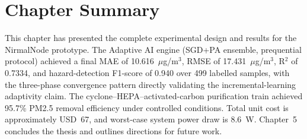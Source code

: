 \section{Chapter Summary}
\label{sec:exp-summary}

This chapter has presented the complete experimental design and results for the NirmalNode prototype. The Adaptive AI engine (SGD+PA ensemble, prequential protocol) achieved a final MAE of 10.616~$\mu$g/m$^3$, RMSE of 17.431~$\mu$g/m$^3$, R$^2$ of 0.7334, and hazard-detection F1-score of 0.940 over 499 labelled samples, with the three-phase convergence pattern directly validating the incremental-learning adaptivity claim. The cyclone--HEPA--activated-carbon purification train achieved 95.7\% PM2.5 removal efficiency under controlled conditions. Total unit cost is approximately USD~67, and worst-case system power draw is 8.6~W. Chapter~5 concludes the thesis and outlines directions for future work.